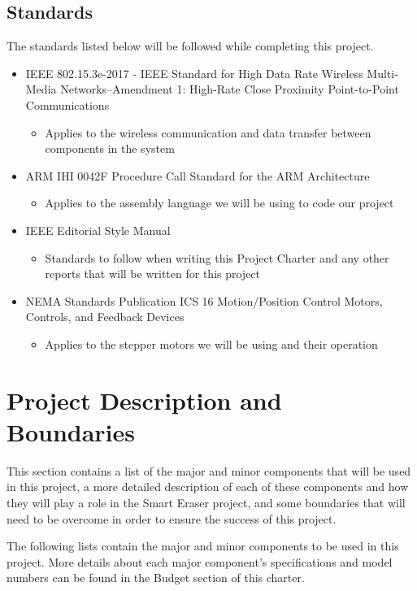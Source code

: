 \subsection{Standards}
\setlength{\parindent}{2.5ex} The standards listed below will be followed while completing this project.
\begin{itemize}
	\item IEEE 802.15.3e-2017 - IEEE Standard for High Data Rate Wireless Multi-Media Networks--Amendment 1: High-Rate Close Proximity Point-to-Point Communications
	\begin{itemize}
		\item Applies to the wireless communication and data transfer between components in the system \cite{wifiStandards}
	\end{itemize}
	\item ARM IHI 0042F Procedure Call Standard for the ARM Architecture
	\begin{itemize}
		\item Applies to the assembly language we will be using to code our project
		\cite{armStandards}
	\end{itemize}
	\item IEEE Editorial Style Manual
	\begin{itemize}
		\item Standards to follow when writing this Project Charter and any other reports that will be written for this project
	\end{itemize}
	\item NEMA Standards Publication ICS 16 Motion/Position Control Motors, Controls, and Feedback Devices
	\begin{itemize}
		\item Applies to the stepper motors we will be using and their operation
	\end{itemize}
\end{itemize}
 
\section{Project Description and Boundaries}
This section contains a list of the major and minor components that will be used in this project, a more detailed description of each of these components and how they will play a role in the Smart Eraser project, and some boundaries that will need to be overcome in order to ensure the success of this project. \par
\setlength{\parindent}{2.5ex}The following lists contain the major and minor components to be used in this project. More details about each major component’s specifications and model numbers can be found in the Budget section of this charter.\\


